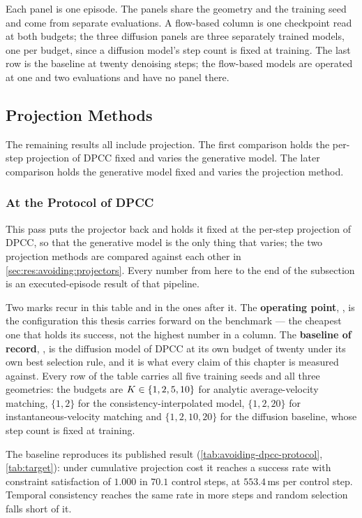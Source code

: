 Each panel is one episode. The panels share the geometry and the training seed and come from separate
evaluations. A flow-based column is one checkpoint read at both budgets; the three diffusion panels are
three separately trained models, one per budget, since a diffusion model's step count is fixed at
training. The last row is the baseline at twenty denoising steps; the flow-based models are operated at
one and two evaluations and have no panel there.

\subsection{Projection Methods}\label{sec:res:avoiding:projection}

The remaining results all include projection. The first comparison holds the per-step projection of
\ac{DPCC} fixed and varies the generative model. The later comparison holds the generative model fixed
and varies the projection method.

\subsubsection{At the Protocol of DPCC}\label{sec:res:avoiding:dpccprotocol}\label{sec:res:fewstep}

This pass puts the projector back and holds it fixed at the per-step projection of \ac{DPCC}, so that
the generative model is the only thing that varies; the two projection methods are compared against
each other in \autoref{sec:res:avoiding:projectors}. Every number from here to the end of the
subsection is an executed-episode result of that pipeline.

Two marks recur in this table and in the ones after it. The \textbf{operating point}, \selectedmark, is
the configuration this thesis carries forward on the benchmark --- the cheapest one that holds its
success, not the highest number in a column. The \textbf{baseline of record}, \baselinemark, is the
diffusion model of \ac{DPCC} at its own budget of twenty under its own best selection rule, and it is
what every claim of this chapter is measured against. Every row of the table carries all five training
seeds and all three geometries: the budgets are $K\in\{1,2,5,10\}$ for analytic average-velocity
matching, $\{1,2\}$ for the consistency-interpolated model, $\{1,2,20\}$ for instantaneous-velocity
matching and $\{1,2,10,20\}$ for the diffusion baseline, whose step count is fixed at training.

The baseline reproduces its published result (\autoref{tab:avoiding-dpcc-protocol},
\autoref{tab:target}): under cumulative projection cost it reaches a success rate with constraint
satisfaction of $1.000$ in $70.1$ control steps, at $553.4$\,ms per control step. Temporal consistency
reaches the same rate in more steps and random selection falls short of it.

